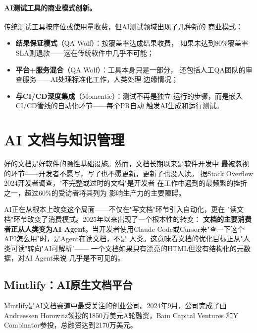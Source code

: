 \paragraph{AI测试工具的商业模式创新。}
传统测试工具按座位或使用量收费，但AI测试领域出现了几种新的
商业模式：
\begin{itemize}
  \item \textbf{结果保证模式}（QA Wolf）：按覆盖率达成结果收费，
    如果未达到80\%覆盖率SLA则退款——这在传统软件中几乎不可能；
  \item \textbf{平台+服务混合}（QA Wolf）：工具本身只是一部分，
    还包括人工QA团队的审查服务——AI处理标准化工作，人类处理
    边缘情况；
  \item \textbf{与CI/CD深度集成}（Momentic）：测试不再是独立
    运行的步骤，而是嵌入CI/CD管线的自动化环节——每个PR自动
    触发AI生成和运行测试。
\end{itemize}


\section{AI 文档与知识管理}
\label{sec:devtools-docs}

好的文档是好软件的隐性基础设施。然而，文档长期以来是软件开发中
最被忽视的环节——开发者不愿写，写了也不愿更新，更新了也没人读。
据Stack Overflow 2024开发者调查，"不完整或过时的文档"是开发者
在工作中遇到的最频繁的挫折之一，超过60\%的受访者将其列为
影响生产力的主要障碍。

AI正在从根本上改变这个局面——不仅在"写文档"环节引入自动化，更在
"读文档"环节改变了消费模式。2025年以来出现了一个根本性的转变：
\textbf{文档的主要消费者正从人类变为AI Agent}。当开发者使用Claude
Code或Cursor来"查一下这个API怎么用"时，是Agent在读文档，不是
人类。这意味着文档的优化目标正从"人类可读"转向"AI可解析"——
一个文档如果只有漂亮的HTML但没有结构化的元数据，对AI Agent来说
几乎是不可见的。

\subsection{Mintlify：AI原生文档平台}
\label{subsec:mintlify}

Mintlify是AI文档赛道中最受关注的创业公司。2024年9月，公司完成了由
Andreessen Horowitz领投的1850万美元A轮融资，Bain Capital Ventures
和Y Combinator参投，总融资达到2170万美元。

